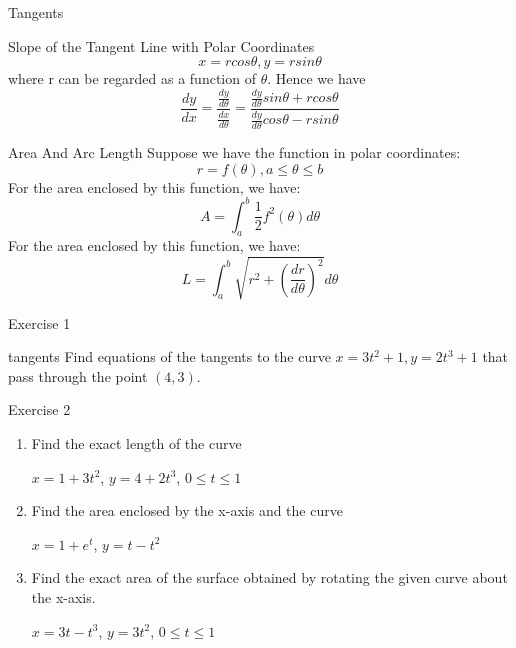\documentclass{beamer}
\begin{document}
\begin{frame}{Tangents}
    \begin{block}{Slope of the Tangent Line with  Polar Coordinates}
    $$x=r cos\theta,y=r sin\theta$$
where r can be regarded as a function of $\theta$. Hence we have
    $$\frac{dy}{dx}=\frac{\frac{dy}{d\theta}}{\frac{dx}{d\theta}}=\frac{\frac{dy}{d\theta}sin \theta + r cos\theta}{\frac{dy}{d\theta} cos\theta -r sin\theta}$$
    \end{block}
\end{frame}
\begin{frame}{Area And Arc Length}
    Suppose we have the function in polar coordinates:
    $$r=f(\theta),a \leqslant \theta \leqslant b$$
    For the area enclosed by this function, we have:
    $$A=\int_a^b \frac{1}{2}f^2(\theta)d\theta$$
    For the area enclosed by this function, we have:
    $$L=\int_a^b \sqrt{r^2+(\frac{dr}{d\theta})^2} d\theta$$
\end{frame}

\begin{frame}{Exercise 1}
    \begin{block}{tangents}
    Find equations of the tangents to the curve $x = 3t^2 +1, y = 2t^3 +1$ that
    pass through the point $(4,3)$.
    \end{block}
\end{frame}

\begin{frame}{Exercise 2}
\begin{enumerate}
        \item Find the exact length of the curve
            \begin{center}
                $x=1+3t^2$, $y=4+2t^3$, $0 \leqslant t \leqslant 1$
            \end{center}
        \item
            Find the area enclosed by the x-axis and the curve
            \begin{center}
                $x=1+e^t$, $y=t-t^2$
            \end{center}
        \item
           Find the exact area of the surface obtained by rotating the given curve about the x-axis.
            \begin{center}
                $x=3t-t^3$, $y=3t^2$, $0 \leqslant t \leqslant 1$
            \end{center}
    \end{enumerate}
\end{frame}
\end{document}

